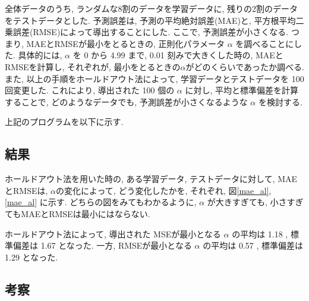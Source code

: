 \documentclass{jsarticle}
\begin{document}
全体データのうち, ランダムな8割のデータを学習データに, 残りの2割のデータをテストデータとした.
予測誤差は, 予測の平均絶対誤差(MAE)と, 平方根平均二乗誤差(RMSE)によって導出することにした.
ここで, 予測誤差が小さくなる. つまり, MAEとRMSEが最小をとるときの, 正則化パラメータ $\alpha$ を調べることにした.
具体的には, $\alpha$ を 0 から 4.99 まで, 0.01 刻みで大きくした時の, MAEとRMSEを計算し, それぞれが, 最小をとるときの$\alpha$がどのくらいであったか調べる.
また, 以上の手順をホールドアウト法によって, 学習データとテストデータを 100 回変更した.
これにより, 導出された 100 個の $\alpha$ に対し, 平均と標準偏差を計算することで, どのようなデータでも, 予測誤差が小さくなるような $\alpha$ を検討する. 

上記のプログラムを以下に示す. 

\subsection{結果}
ホールドアウト法を用いた時の, ある学習データ, テストデータに対して, MAEとRMSEは, $\alpha$の変化によって, どう変化したかを, それぞれ, 図\ref{mae_al}, \ref{mae_al} に示す.
どちらの図をみてもわかるように, $\alpha$ が大きすぎても, 小さすぎてもMAEとRMSEは最小にはならない. 

ホールドアウト法によって, 導出された MSEが最小となる $\alpha$ の平均は 1.18 , 
標準偏差は 1.67 となった.
一方, RMSEが最小となる $\alpha$ の平均は 0.57 , 標準偏差は 1.29 となった. 


\subsection{考察}
\end{document}
